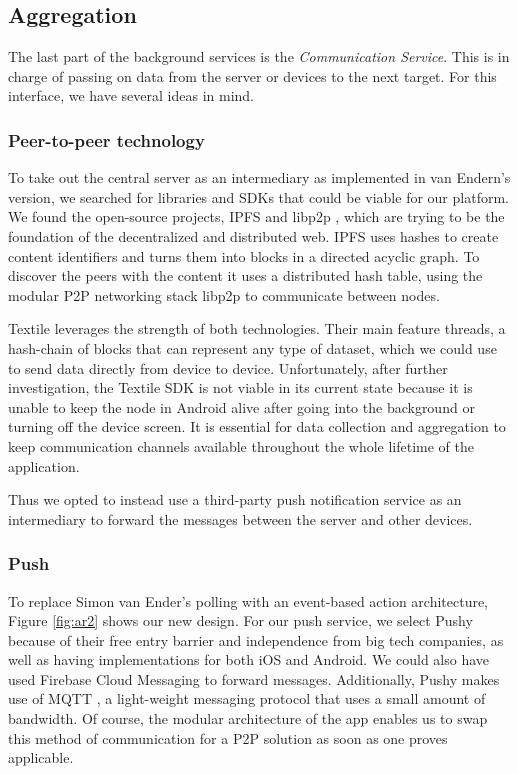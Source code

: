 \subsection{Aggregation}
The last part of the background services is the \textit{Communication Service}. This is in charge of passing on data from the server or devices to the next target. For this interface, we have several ideas in mind.
 
\subsubsection{Peer-to-peer technology}
To take out the central server as an intermediary as implemented in van Endern's version, we searched for libraries and SDKs that could be viable for our platform. We found the open-source projects, IPFS \cite{DBLP:journals/corr/Benet14} and libp2p \cite{libp2p}, which are trying to be the foundation of the decentralized and distributed web. IPFS uses hashes to create content identifiers and turns them into blocks in a directed acyclic graph. To discover the peers with the content it uses a distributed hash table, using the modular P2P networking stack libp2p to communicate between nodes.

Textile leverages the strength of both technologies. Their main feature threads, a hash-chain of blocks that can represent any type of dataset, which we could use to send data directly from device to device. Unfortunately, after further investigation, the Textile SDK is not viable in its current state because it is unable to keep the node in Android alive after going into the background or turning off the device screen. It is essential for data collection and aggregation to keep communication channels available throughout the whole lifetime of the application.

Thus we opted to instead use a third-party push notification service as an intermediary to forward the messages between the server and other devices.

\subsubsection{Push}
To replace Simon van Ender's polling with an event-based action architecture, Figure \ref{fig:ar2} shows our new design. For our push service, we select Pushy \cite{pushy} because of their free entry barrier and independence from big tech companies, as well as having implementations for both iOS and Android. We could also have used Firebase Cloud Messaging to forward messages. Additionally, Pushy makes use of MQTT \cite{mqtt}, a light-weight messaging protocol that uses a small amount of bandwidth. Of course, the modular architecture of the app enables us to swap this method of communication for a P2P solution as soon as one proves applicable.

